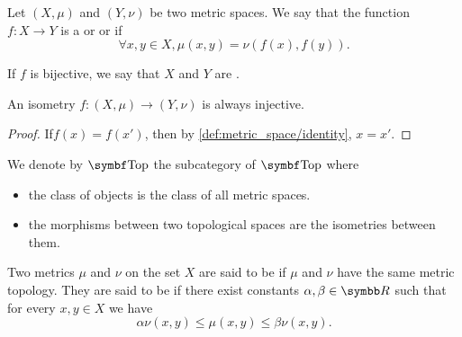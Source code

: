 \begin{definition}\label{def:isometry}\cite[253]{Engelking1989}
  Let \( (X, \mu) \) and \( (Y, \nu) \) be two metric spaces. We say that the function \( f: X \to Y \) is a  or  or  if
  \begin{equation*}
    \forall x, y \in X, \mu(x, y) = \nu(f(x), f(y)).
  \end{equation*}

  If \( f \) is bijective, we say that \( X \) and \( Y \) are .
\end{definition}

\begin{proposition}\label{def:isometry_is_injective}
  An isometry \( f: (X, \mu) \to (Y, \nu) \) is always injective.
\end{proposition}
\begin{proof}
  If\LEM \( f(x) = f(x') \), then by \ref{def:metric_space/identity}, \( x = x' \).
\end{proof}

\begin{definition}\label{def:category_of_metric_spaces}
  We denote by \( \Cat{Top} \) the subcategory of \( \Bold{Top} \) where
  \begin{itemize}
    \item the class of objects is the class of all metric spaces.
    \item the morphisms between two topological spaces are the isometries between them.
  \end{itemize}
\end{definition}

\begin{definition}\label{def:equivalent_metrics}
  Two metrics \( \mu \) and \( \nu \) on the set \( X \) are said to be  if \( \mu \) and \( \nu \) have the same metric topology. They are said to be  if there exist constants \( \alpha, \beta \in \R \) such that for every \( x, y \in X \) we have
  \begin{equation*}
    \alpha \nu(x, y) \leq \mu(x, y) \leq \beta \nu(x, y).
  \end{equation*}
\end{definition}

